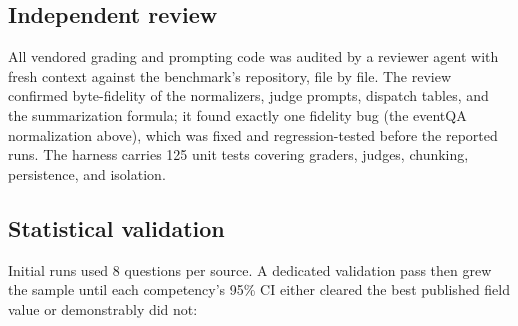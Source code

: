\documentclass{article}
\begin{document}
\subsection{Independent review}
All vendored grading and prompting code was audited by a reviewer agent with
fresh context against the benchmark's repository, file by file. The review
confirmed byte-fidelity of the normalizers, judge prompts, dispatch tables,
and the summarization formula; it found exactly one fidelity bug (the eventQA
normalization above), which was fixed and regression-tested before the
reported runs. The harness carries 125 unit tests covering graders, judges,
chunking, persistence, and isolation.

\subsection{Statistical validation}
\label{sec:validation}
Initial runs used 8 questions per source. A dedicated validation pass then
grew the sample until each competency's 95\% CI either cleared the best
published field value or demonstrably did not:
\end{document}
